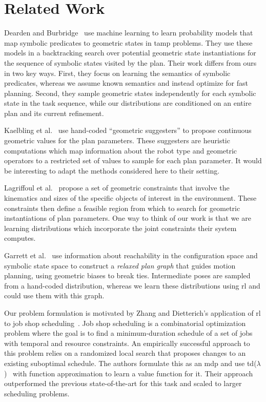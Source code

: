 \section{Related Work}
Dearden and Burbridge~\cite{deardenplanningtamp} use machine learning
to learn probability models that map symbolic predicates to
geometric states in {\sc tamp} problems. They use these models in a
backtracking search over potential geometric state instantiations for
the sequence of symbolic states visited by the plan.  Their work
differs from ours in two key ways. First, they focus on learning the
semantics of symbolic predicates, whereas we assume known semantics
and instead optimize for fast planning. Second, they sample geometric
states independently for each symbolic state in the task sequence,
while our distributions are conditioned on an entire plan and its
current refinement.

Kaelbling et al.~\cite{kaelbling2011hierarchical} use hand-coded
``geometric suggesters'' to propose continuous geometric values for
the plan parameters. These suggesters are heuristic computations which
map information about the robot type and geometric operators to a
restricted set of values to sample for each plan parameter. It would
be interesting to adapt the methods considered here to their setting.

Lagriffoul et al.~\cite{lagriffoul2014orientation} propose a set of
geometric constraints that involve the kinematics and sizes of the
specific objects of interest in the environment. These constraints
then define a feasible region from which to search for geometric
instantiations of plan parameters. One way to think of our work is
that we are learning distributions which incorporate the joint
constraints their system computes.

Garrett et al.~\cite{GarrettWAFR14} use information about reachability
in the configuration space and symbolic state space to construct a
\emph{relaxed plan graph} that guides motion planning, using geometric
biases to break ties. Intermediate poses are sampled from a hand-coded
distribution, whereas we learn these distributions using {\sc rl} and
could use them with this graph.

Our problem formulation is motivated by Zhang and Dietterich's
application of {\sc rl} to job shop
scheduling~\cite{JobShopSched}. Job shop scheduling is a combinatorial
optimization problem where the goal is to find a minimum-duration
schedule of a set of jobs with temporal and resource constraints. An
empirically successful approach to this problem relies on a randomized
local search that proposes changes to an existing suboptimal
schedule. The authors formulate this as an {\sc mdp} and use {\sc
  td}($\lambda$)~\cite{suttonbarto} with function approximation to
learn a value function for it. Their approach outperformed the
previous state-of-the-art for this task and scaled to larger scheduling
problems.

